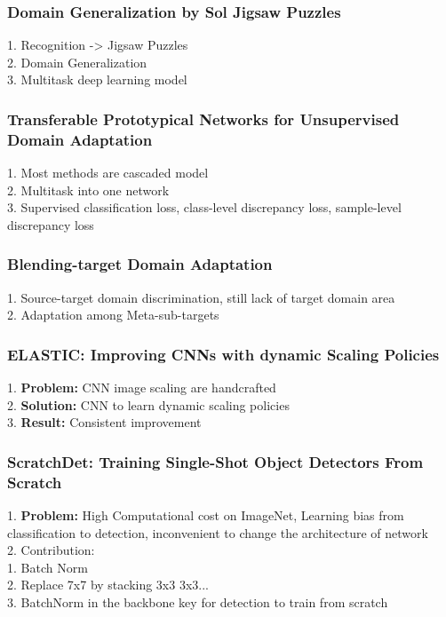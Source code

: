 \subsubsection{Domain Generalization by Sol Jigsaw Puzzles}
    1. Recognition -> Jigsaw Puzzles \\
    2. Domain Generalization \\
    3. Multitask deep learning model \\
\subsubsection{Transferable Prototypical Networks for Unsupervised Domain Adaptation}
    1. Most methods are cascaded model \\
    2. Multitask into one network \\
    3. Supervised classification loss, class-level discrepancy loss, sample-level discrepancy loss \\
\subsubsection{Blending-target Domain Adaptation}
    1. Source-target domain discrimination, still lack of target domain area \\
    2. Adaptation among Meta-sub-targets \\
\subsubsection{ELASTIC: Improving CNNs with dynamic Scaling Policies}
    1. {\bf Problem:} CNN image scaling are handcrafted \\
    2. {\bf Solution:} CNN to learn dynamic scaling policies \\
    3. {\bf Result:} Consistent improvement \\
\subsubsection{ScratchDet: Training Single-Shot Object Detectors From Scratch}
    1. {\bf Problem:} High Computational cost on ImageNet, Learning bias from classification to detection, inconvenient to change the architecture of network \\
    2. Contribution:  \\
        1. Batch Norm \\
        2. Replace 7x7 by stacking 3x3 3x3... \\
        3. BatchNorm in the backbone key for detection to train from scratch \\
